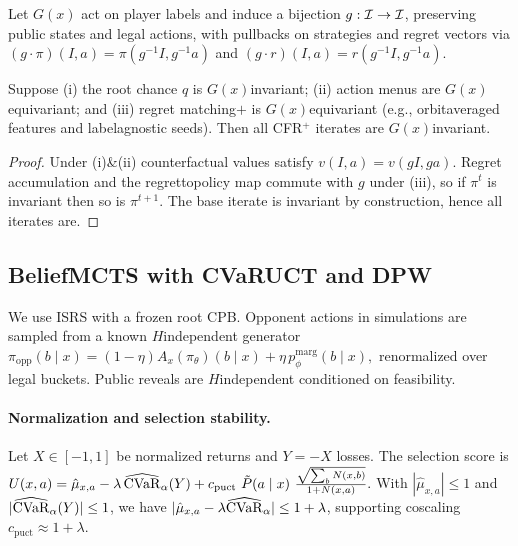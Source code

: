 \begin{definition}
Let $G(x)$ act on player labels and induce a bijection $g:\mathcal{I}\to\mathcal{I}$, preserving public states and legal actions, with pullbacks on strategies and regret vectors via $(g\cdot \pi)(I,a)=\pi(g^{-1}I,g^{-1}a)$ and $(g\cdot r)(I,a)=r(g^{-1}I,g^{-1}a)$.
\end{definition}

\begin{theorem}\label{thm:symm}
Suppose (i) the root chance $q$ is $G(x)$\textendash invariant; (ii) action menus are $G(x)$\textendash equivariant; and (iii) regret matching$+$ is $G(x)$\textendash equivariant (e.g., orbit\textendash averaged features and label\textendash agnostic seeds). Then all CFR$^+$ iterates are $G(x)$\textendash invariant.
\end{theorem}
\begin{proof}
Under (i)\&(ii) counterfactual values satisfy $v(I,a)=v(gI,ga)$. Regret accumulation and the regret\textendash to\textendash policy map commute with $g$ under (iii), so if $\pi^t$ is invariant then so is $\pi^{t+1}$. The base iterate is invariant by construction, hence all iterates are.
\end{proof}

\subsection{Belief\textendash MCTS with CVaR\textendash UCT and DPW}
We use IS\textendash RS with a frozen root CPB. Opponent actions in simulations are sampled from a known $H$\textendash independent generator
$
\pi_{\mathrm{opp}}(b\mid x)=(1-\eta)A_x(\pi_\theta)(b\mid x)+\eta\,p_\phi^{\mathrm{marg}}(b\mid x),
$
renormalized over legal buckets. Public reveals are $H$\textendash independent conditioned on feasibility.

\paragraph{Normalization and selection stability.}
Let $X\in[-1,1]$ be normalized returns and $Y=-X$ losses. The selection score is
$
U(x,a)=\hat\mu_{x,a}-\lambda\,\widehat{\CVaR}_\alpha(Y)+c_{\text{puct}}\ \tilde P(a\mid x)\ \frac{\sqrt{\sum_b N(x,b)}}{1+N(x,a)}.
$
With $|\hat\mu_{x,a}|\le 1$ and $|\widehat{\mathrm{CVaR}}_\alpha(Y)|\le 1$, we have $|\hat\mu_{x,a}-\lambda \widehat{\mathrm{CVaR}}_\alpha|\le 1+\lambda$, supporting co\textendash scaling $c_{\text{puct}}\approx 1+\lambda$.


